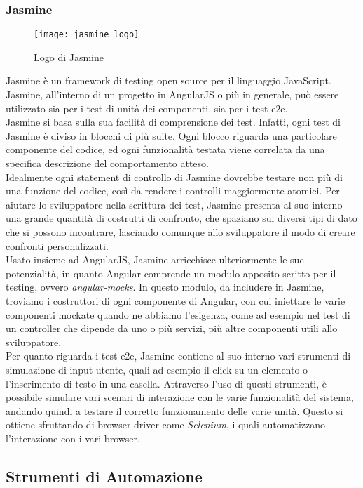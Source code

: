 \subsubsection{Jasmine}
\begin{figure}[htb] 
    \centering 
    \texttt{[image: jasmine\_logo]} 
    \caption{Logo di Jasmine}
\end{figure}
Jasmine è un framework di testing open source per il linguaggio JavaScript. Jasmine, all’interno di un progetto in AngularJS o più in generale, può essere utilizzato sia per i test di unità dei componenti, sia per i test e2e.\\
Jasmine si basa sulla sua facilità di comprensione dei test. Infatti, ogni test di Jasmine è diviso in blocchi di più suite. Ogni blocco riguarda una particolare componente del codice, ed ogni funzionalità testata viene correlata da una specifica descrizione del comportamento atteso.\\
Idealmente ogni statement di controllo di Jasmine dovrebbe testare non più di una funzione del codice, così da rendere i controlli maggiormente atomici. Per aiutare lo sviluppatore nella scrittura dei test, Jasmine presenta al suo interno una grande quantità di costrutti di confronto, che spaziano sui diversi tipi di dato che si possono incontrare, lasciando comunque allo sviluppatore il modo di creare confronti personalizzati.\\
Usato insieme ad AngularJS, Jasmine arricchisce ulteriormente le sue potenzialità, in quanto Angular comprende un modulo apposito scritto per il testing, ovvero \emph{angular-mocks}. In questo modulo, da includere in Jasmine, troviamo i costruttori di ogni componente di Angular, con cui iniettare le varie componenti mockate quando ne abbiamo l’esigenza, come ad esempio nel test di un controller che dipende da uno o più servizi, più altre componenti utili allo sviluppatore.\\
Per quanto riguarda i test \gls{e2e}, Jasmine contiene al suo interno vari strumenti di simulazione di input utente, quali ad esempio il click su un elemento o l’inserimento di testo in una casella. Attraverso l’uso di questi strumenti, è possibile simulare vari scenari di interazione con le varie funzionalità del sistema, andando quindi a testare il corretto funzionamento delle varie unità. 
Questo si ottiene sfruttando di browser driver come \emph{Selenium}, i quali automatizzano l’interazione con i vari browser.

\subsection{Strumenti di Automazione}
